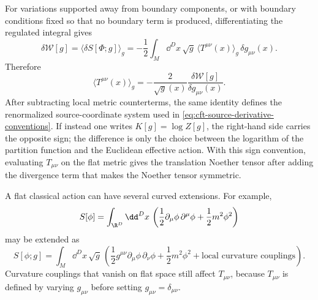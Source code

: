 \begin{definition}
\[\]
For variations supported away from boundary components, or with boundary
conditions fixed so that no boundary term is produced, differentiating the
regulated integral gives
\[
  \delta\mathcal W[g]
  =
  \langle\delta S[\Phi;g]\rangle_g
  =
  -\frac12
  \int_M\dd^D x\,\sqrt g\,
  \langle T^{\mu\nu}(x)\rangle_g\,\delta g_{\mu\nu}(x).
\]
Therefore
\[
  \langle T^{\mu\nu}(x)\rangle_g
  =
  -\frac{2}{\sqrt g(x)}
  \frac{\delta\mathcal W[g]}{\delta g_{\mu\nu}(x)}.
\]
After subtracting local metric counterterms, the same identity defines the
renormalized source-coordinate system used in
\eqref{eq:cft-source-derivative-conventions}.  If instead one writes
\(K[g]=\log Z[g]\), the right-hand side carries the opposite sign; the
difference is only the choice between the logarithm of the partition function
and the Euclidean effective action.
With this sign convention, evaluating \(T_{\mu\nu}\) on the flat metric gives
the translation Noether tensor after adding the divergence term that makes the
Noether tensor symmetric.
\end{definition}

\begin{remark}
\label{rem:curved-extensions-flat-stress}
A flat classical action can have several curved extensions.  For example,
\[
  S[\phi]
  =
  \int_{\R^D}\dd^Dx\,
  \left(
  \frac12\partial_\mu\phi\,\partial^\mu\phi
  +
  \frac12m^2\phi^2
  \right)
\]
may be extended as
\[
  S[\phi;g]
  =
  \int_M\dd^Dx\,\sqrt g\,
  \left(
  \frac12g^{\mu\nu}\partial_\mu\phi\,\partial_\nu\phi
  +
  \frac12m^2\phi^2
  +
  \text{local curvature couplings}
  \right).
\]
Curvature couplings that vanish on flat space still affect \(T_{\mu\nu}\),
because \(T_{\mu\nu}\) is defined by varying \(g_{\mu\nu}\) before setting
\(g_{\mu\nu}=\delta_{\mu\nu}\).
\end{remark}

